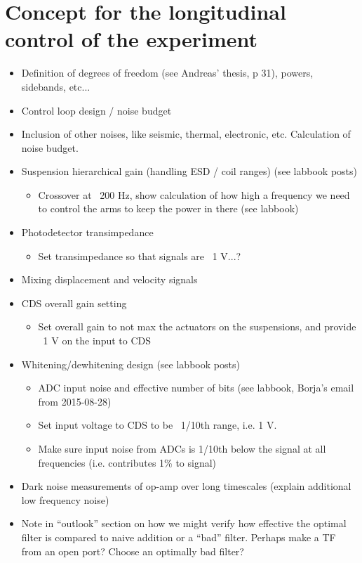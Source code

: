\chapter{\label{c:speedmeter-control}Concept for the longitudinal control of the \SSM{} experiment}


\begin{itemize}
  \item Definition of degrees of freedom (see Andreas' thesis, p 31), powers, sidebands, etc...
  \item Control loop design / noise budget
  \item Inclusion of other noises, like seismic, thermal, electronic, etc. Calculation of noise budget.
  \item Suspension hierarchical gain (handling ESD / coil ranges) (see labbook posts)
     \begin{itemize}
        \item Crossover at ~200 Hz, show calculation of how high a frequency we need to control the arms to keep the power in there (see labbook)
     \end{itemize}
  \item Photodetector transimpedance
    \begin{itemize}
      \item Set transimpedance so that signals are ~1 V...?
    \end{itemize}
  \item Mixing displacement and velocity signals
  \item CDS overall gain setting
    \begin{itemize}
      \item Set overall gain to not max the actuators on the suspensions, and provide ~1 V on the input to CDS
    \end{itemize}
  \item Whitening/dewhitening design (see labbook posts)
    \begin{itemize}
      \item ADC input noise and effective number of bits (see labbook, Borja's email from 2015-08-28)
      \item Set input voltage to CDS to be ~1/10th range, i.e. 1 V.
      \item Make sure input noise from ADCs is 1/10th below the signal at all frequencies (i.e. contributes 1\% to signal)
    \end{itemize}
  \item Dark noise measurements of op-amp over long timescales (explain additional low frequency noise)
  \item Note in ``outlook'' section on how we might verify how effective the optimal filter is compared to naive addition or a ``bad'' filter. Perhaps make a TF from an open port? Choose an optimally bad filter?
\end{itemize}


